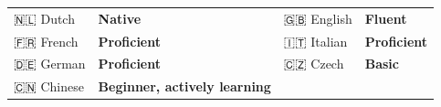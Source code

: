 
\begin{table}[ht]
    \centering
    \begin{tabular}{llll}
    
        {🇳🇱 Dutch} & {\bf Native} &{🇬🇧 English} & {\bf Fluent} \\
        {🇫🇷 French} & {\bf Proficient} &{🇮🇹 Italian} & {\bf Proficient} \\
        {🇩🇪 German} & {\bf Proficient} &{🇨🇿 Czech} & {\bf Basic} \\
        {🇨🇳 Chinese} & {\bf Beginner, actively learning} &{} & {} \\
    \end{tabular}
\end{table}